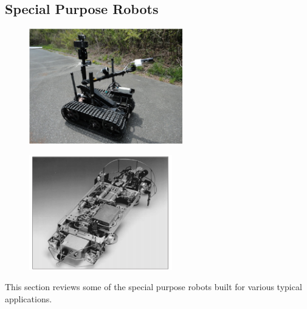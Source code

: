 \subsection{ Special Purpose Robots}
\begin{figure}
	\centering
	\begin{minipage}{.5\textwidth}
		\centering
		\includegraphics[height=5cm,keepaspectratio]{Chapter2/fig/FukusimaRobot}
		\label{fig:fukuRobot}
	\end{minipage}%
	\begin{minipage}{.5\textwidth}
		\centering
		\includegraphics[width=1\linewidth,height=5cm,keepaspectratio]{Chapter2/fig/nero3}
		\label{fig:nero3}
	\end{minipage}
\end{figure}
This section reviews some of the special purpose  robots built for various typical applications. 
